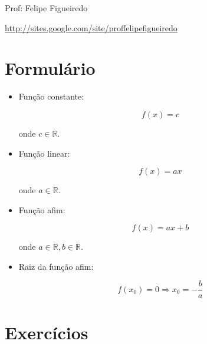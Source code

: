 \documentclass[a4paper]{article}
\begin{document}
\parbox[c]{.825\textwidth}{\raggedright%
{Prof: Felipe Figueiredo\par}
{\url{http://sites.google.com/site/proffelipefigueiredo}}

\vspace{1cm}
}



\section{Formulário}

\begin{itemize}
\item Função constante:

\begin{displaymath}
  f(x) = c
\end{displaymath}

onde $c \in \mathbb{R}$.

\item Função linear:

\begin{displaymath}
  f(x) = ax
\end{displaymath}

onde $a \in \mathbb{R}$.

\item Função afim:

\begin{displaymath}
  f(x) = ax +b
\end{displaymath}

onde $a \in \mathbb{R}, b \in \mathbb{R}$.

\item Raiz da função afim:

\begin{displaymath}
 f(x_0) = 0 \Rightarrow  x_0 = -\frac{b}{a}
\end{displaymath}

\end{itemize}


\section{Exercícios}
\end{document}

